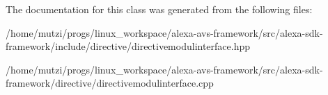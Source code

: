 The documentation for this class was generated from the following files\+:\begin{DoxyCompactItemize}
\item 
/home/mutzi/progs/linux\+\_\+workspace/alexa-\/avs-\/framework/src/alexa-\/sdk-\/framework/include/directive/directivemodulinterface.\+hpp\item 
/home/mutzi/progs/linux\+\_\+workspace/alexa-\/avs-\/framework/src/alexa-\/sdk-\/framework/directive/directivemodulinterface.\+cpp\end{DoxyCompactItemize}
